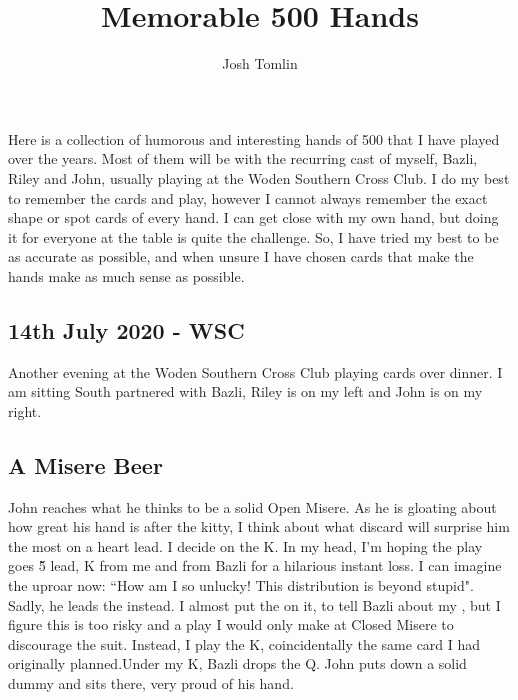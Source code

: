 \documentclass[a4paper]{JoshCards}
\title{Memorable 500 Hands}
\author{Josh Tomlin}
\date{}
\begin{document}
\maketitle

Here is a collection of humorous and interesting hands of 500 that I have played over the years. Most of them will be with the recurring cast of myself, Bazli, Riley and John, usually playing at the Woden Southern Cross Club. I do my best to remember the cards and play, however I cannot always remember the exact shape or spot cards of every hand. I can get close with my own hand, but doing it for everyone at the table is quite the challenge. So, I have tried my best to be as accurate as possible, and when unsure I have chosen cards that make the hands make as much sense as possible.

\subsection*{14th July 2020 - WSC}

Another evening at the Woden Southern Cross Club playing cards over dinner. I am sitting South partnered with Bazli, Riley is on my left and John is on my right.

\subsection*{A Misere Beer}

\gamefont{\larger}
\leftupper{}%
{}{}
\showAll*

John reaches what he thinks to be a solid Open Misere. As he is gloating about how great his hand is after the kitty, I think about what discard will surprise him the most on a heart lead. I decide on the \D K. In my head, I'm hoping the play goes \H5 lead, \D K from me and  from Bazli for a hilarious instant loss. I can imagine the uproar now: ``How am I so unlucky! This distribution is beyond stupid". Sadly, he leads the  instead. I almost put the  on it, to tell Bazli about my , but I figure this is too risky and a play I would only make at Closed Misere to discourage the suit. Instead, I play the \D K, coincidentally the same card I had originally planned.Under my \D K, Bazli drops the \D Q. John puts down a solid dummy and sits there, very proud of his hand. 
\end{document}
